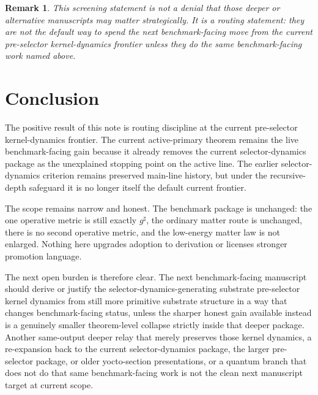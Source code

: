 \documentclass[11pt]{article}
\newcommand{\CompletedMetric}{g^{\sharp}}
\newtheorem{remark}{Remark}
\begin{document}
\begin{remark}
This screening statement is not a denial that those deeper or alternative manuscripts may matter strategically. It is a routing statement: they are not the default way to spend the next benchmark-facing move from the current pre-selector kernel-dynamics frontier unless they do the same benchmark-facing work named above.
\end{remark}

\section{Conclusion}

The positive result of this note is routing discipline at the current pre-selector kernel-dynamics frontier. The current active-primary theorem remains the live benchmark-facing gain because it already removes the current selector-dynamics package as the unexplained stopping point on the active line. The earlier selector-dynamics criterion remains preserved main-line history, but under the recursive-depth safeguard it is no longer itself the default current frontier.

The scope remains narrow and honest. The benchmark package is unchanged: the one operative metric is still exactly \(\CompletedMetric\), the ordinary matter route is unchanged, there is no second operative metric, and the low-energy matter law is not enlarged. Nothing here upgrades adoption to derivation or licenses stronger promotion language.

The next open burden is therefore clear. The next benchmark-facing manuscript should derive or justify the selector-dynamics-generating substrate pre-selector kernel dynamics from still more primitive substrate structure in a way that changes benchmark-facing status, unless the sharper honest gain available instead is a genuinely smaller theorem-level collapse strictly inside that deeper package. Another same-output deeper relay that merely preserves those kernel dynamics, a re-expansion back to the current selector-dynamics package, the larger pre-selector package, or older yocto-section presentations, or a quantum branch that does not do that same benchmark-facing work is not the clean next manuscript target at current scope.
\end{document}
